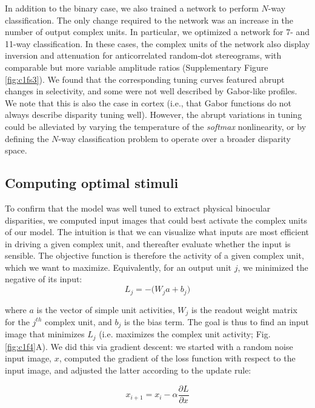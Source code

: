 In addition to the binary case, we also trained a network to perform $N$-way classification. The only change required to the network was an increase in the number of output complex units. In particular, we optimized a network for 7- and 11-way classification. In these cases, the complex units of the network also display inversion and attenuation for anticorrelated random-dot stereograms, with comparable but more variable amplitude ratios (Supplementary Figure \ref{fig:c1fs3}). We found that the corresponding tuning curves featured abrupt changes in selectivity, and some were not well described by Gabor-like profiles. We note that this is also the case in cortex (i.e., that Gabor functions do not always describe disparity tuning well). However, the abrupt variations in tuning could be alleviated by varying the temperature of the \textit{softmax} nonlinearity, or by defining the $N$-way classification problem to operate over a broader disparity space.


\subsection*{Computing optimal stimuli}

To confirm that the model was well tuned to extract physical binocular disparities, we computed input images that could best activate the complex units of our model. The intuition is that we can visualize what inputs are most efficient in driving a given complex unit, and thereafter evaluate whether the input is sensible. The objective function is therefore the activity of a given complex unit, which we want to maximize. Equivalently, for an output unit $j$, we minimized the negative of its input:
\begin{equation}
  L_j = - \big( W_j a + b_j \big) 
  \label{eq:OptLoss}
\end{equation}

where $a$ is the vector of simple unit activities, $W_j$ is the readout weight matrix for the $j^{th}$ complex unit, and $b_j$ is the bias term. The goal is thus to find an input image that minimizes $L_j$ (i.e. maximizes the complex unit activity; Fig. \ref{fig:c1f4}A). We did this via gradient descent: we started with a random noise input image, $x$, computed the gradient of the loss function with respect to the input image, and adjusted the latter according to the update rule:

\begin{equation}
  x_{i+1} = x_i - \alpha\frac{\partial L}{\partial x}
\end{equation}

